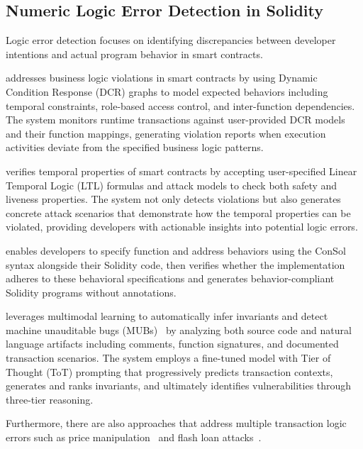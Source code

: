 \documentclass[pdflatex,sn-basic]{sn-jnl}%
\theoremstyle{thmstyleone}%
\theoremstyle{thmstyletwo}%
\theoremstyle{thmstylethree}%
\begin{document}
\subsection{Numeric Logic Error Detection in Solidity}
Logic error detection focuses on identifying discrepancies between developer intentions and actual program behavior in smart contracts.

\citep{highguard} addresses business logic violations in smart contracts by using Dynamic Condition Response (DCR) graphs
to model expected behaviors including temporal constraints, role-based access control, and inter-function dependencies.
The system monitors runtime transactions against user-provided DCR models and their function mappings,
generating violation reports when execution activities deviate from the specified business logic patterns.

\citep{smartpulse} verifies temporal properties of smart contracts by accepting user-specified Linear Temporal Logic (LTL) formulas
and attack models to check both safety and liveness properties.
The system not only detects violations but also generates concrete attack scenarios that demonstrate how the temporal properties can be violated,
providing developers with actionable insights into potential logic errors.

\citep{consolidating} enables developers to specify function and address behaviors using the ConSol syntax alongside their Solidity code,
then verifies whether the implementation adheres to these behavioral specifications and generates behavior-compliant Solidity programs without annotations.

\citep{smartinv} leverages multimodal learning to automatically infer invariants and detect machine unauditable bugs (MUBs)~\citep{exploitablebugs}
by analyzing both source code and natural language artifacts including comments, function signatures, and documented transaction scenarios.
The system employs a fine-tuned model with Tier of Thought (ToT) prompting that progressively predicts transaction contexts,
generates and ranks invariants, and ultimately identifies vulnerabilities through three-tier reasoning.

Furthermore, there are also approaches that address multiple transaction logic errors such as price manipulation~\citep{defiranger,defiguard,pomabuster,secplf,defitainter}
and flash loan attacks~\citep{defitail,midnight}.
\end{document}
